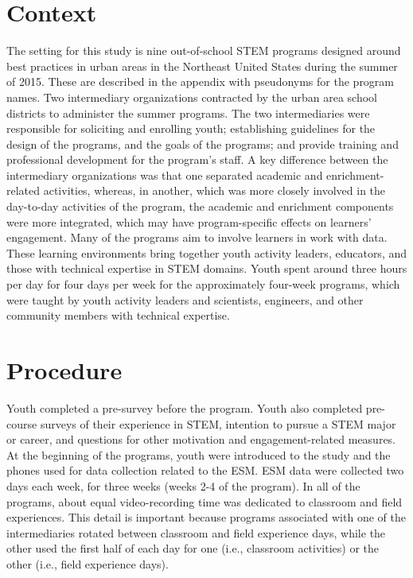 \documentclass[]{book}
\theoremstyle{definition}
\theoremstyle{definition}
\theoremstyle{definition}
\theoremstyle{remark}
\begin{document}
\section{Context}\label{context}

The setting for this study is nine out-of-school STEM programs designed
around best practices in urban areas in the Northeast United States
during the summer of 2015. These are described in the appendix with
pseudonyms for the program names. Two intermediary organizations
contracted by the urban area school districts to administer the summer
programs. The two intermediaries were responsible for soliciting and
enrolling youth; establishing guidelines for the design of the programs,
and the goals of the programs; and provide training and professional
development for the program's staff. A key difference between the
intermediary organizations was that one separated academic and
enrichment-related activities, whereas, in another, which was more
closely involved in the day-to-day activities of the program, the
academic and enrichment components were more integrated, which may have
program-specific effects on learners' engagement. Many of the programs
aim to involve learners in work with data. These learning environments
bring together youth activity leaders, educators, and those with
technical expertise in STEM domains. Youth spent around three hours per
day for four days per week for the approximately four-week programs,
which were taught by youth activity leaders and scientists, engineers,
and other community members with technical expertise.

\section{Procedure}\label{procedure}

Youth completed a pre-survey before the program. Youth also completed
pre-course surveys of their experience in STEM, intention to pursue a
STEM major or career, and questions for other motivation and
engagement-related measures. At the beginning of the programs, youth
were introduced to the study and the phones used for data collection
related to the ESM. ESM data were collected two days each week, for
three weeks (weeks 2-4 of the program). In all of the programs, about
equal video-recording time was dedicated to classroom and field
experiences. This detail is important because programs associated with
one of the intermediaries rotated between classroom and field experience
days, while the other used the first half of each day for one (i.e.,
classroom activities) or the other (i.e., field experience days).
\end{document}
